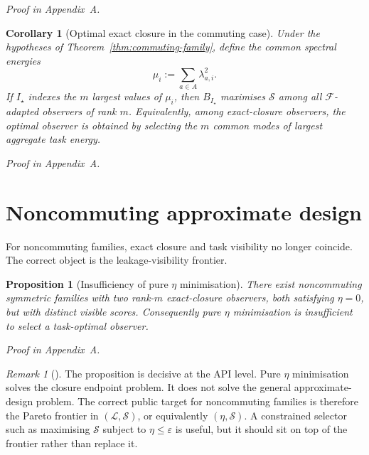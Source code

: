 \documentclass[11pt,a4paper]{article}
\numberwithin{equation}{section}
\theoremstyle{thmcompact}
\newtheorem{proposition}[theorem]{Proposition}
\newtheorem{corollary}[theorem]{Corollary}
\theoremstyle{remark}
\newtheorem*{remarkplain}{Remark}
\newenvironment{remark}[1][]%
{\begin{remarkbox}\begin{remarkplain}[#1]\normalfont}
{\end{remarkplain}\end{remarkbox}}
\newcommand{\proofappendix}{\par{\hfill\scriptsize\emph{Proof in Appendix~A.}}\par}
\begin{document}
\proofappendix

\begin{corollary}[Optimal exact closure in the commuting case]
\label{cor:optimal-commuting}
Under the hypotheses of Theorem~\ref{thm:commuting-family}, define the common spectral energies
\begin{equation}
\mu_i:=\sum_{a\in A}\lambda_{a,i}^2.
\label{eq:mu-def}
\end{equation}
If $I_\star$ indexes the $m$ largest values of $\mu_i$, then $B_{I_\star}$ maximises $\mathcal S$ among all $\mathcal F$-adapted observers of rank $m$. Equivalently, among exact-closure observers, the optimal observer is obtained by selecting the $m$ common modes of largest aggregate task energy.
\end{corollary}

\proofappendix

\section{Noncommuting approximate design}

For noncommuting families, exact closure and task visibility no longer coincide. The correct object is the leakage-visibility frontier.

\begin{proposition}[Insufficiency of pure $\eta$ minimisation]
\label{prop:eta-insufficient}
There exist noncommuting symmetric families with two rank-$m$ exact-closure observers, both satisfying $\eta=0$, but with distinct visible scores. Consequently pure $\eta$ minimisation is insufficient to select a task-optimal observer.
\end{proposition}

\proofappendix

\begin{remark}
The proposition is decisive at the API level. Pure $\eta$ minimisation solves the closure endpoint problem. It does not solve the general approximate-design problem. The correct public target for noncommuting families is therefore the Pareto frontier in $(\mathcal L,\mathcal S)$, or equivalently $(\eta,\mathcal S)$. A constrained selector such as maximising $\mathcal S$ subject to $\eta\le \varepsilon$ is useful, but it should sit on top of the frontier rather than replace it.
\end{remark}
\end{document}
